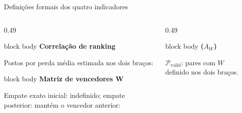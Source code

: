 \begin{frame}{Definições formais dos quatro indicadores}
  \begin{columns}[T,onlytextwidth]
    \begin{column}{0.49\textwidth}
      \begin{beamercolorbox}[wd=\linewidth,sep=.11cm,rounded=true]{block body}
        {\bfseries\color{CoInfoBlue}Correlação de ranking}\par
        {\fontsize{8.5}{10.1}\selectfont Postos por perda média estimada nos dois braços:}\par\vspace{.05cm}
      \end{beamercolorbox}
      \vspace{.09cm}
      \begin{beamercolorbox}[wd=\linewidth,sep=.11cm,rounded=true]{block body}
        {\bfseries\color{CoInfoBlue}Matriz de vencedores $\mathbf W$}\par
        {\fontsize{8.3}{9.8}\selectfont Empate exato inicial: indefinido; empate posterior: mantém o vencedor anterior:}\par\vspace{.05cm}
      \end{beamercolorbox}
    \end{column}
    \begin{column}{0.49\textwidth}
      \begin{beamercolorbox}[wd=\linewidth,sep=.11cm,rounded=true]{block body}
        {\bfseries\color{CoInfoBlue}\WA{} ($A_W$)}\par
        {\fontsize{8.5}{10.1}\selectfont $\mathcal P_{\mathrm{valid}}$: pares com $W$ definido nos dois braços.}\par\vspace{.05cm}
        \resizebox{0.88\linewidth}{!}{$
}
\end{beamercolorbox}
\end{column}
\end{columns}
\end{frame}
